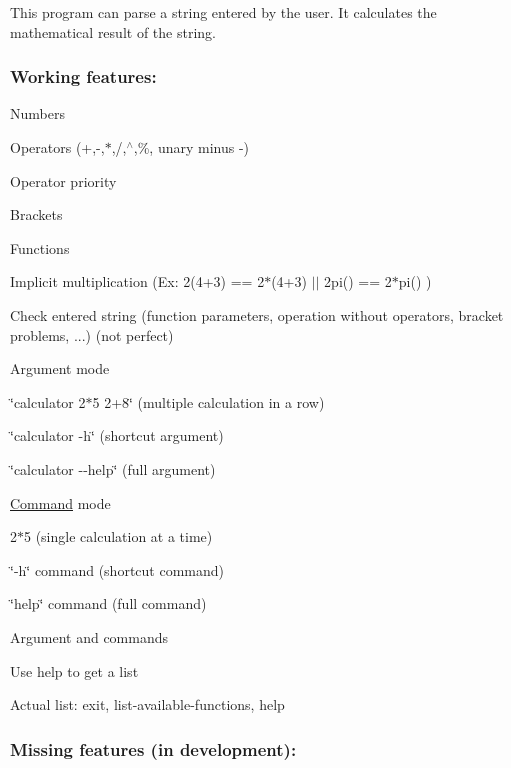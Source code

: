 This program can parse a string entered by the user. It calculates the mathematical result of the string.

\subsubsection*{Working features\+:}


\begin{DoxyItemize}
\item Numbers
\item Operators (+,-\/,$\ast$,/,$^\wedge$,\%, unary minus -\/)
\item Operator priority
\item Brackets
\item Functions
\item Implicit multiplication (Ex\+: 2(4+3) == 2$\ast$(4+3) $\vert$$\vert$ 2pi() == 2$\ast$pi() )
\item Check entered string (function parameters, operation without operators, bracket problems, ...) (not perfect)
\item Argument mode
\begin{DoxyItemize}
\item \char`\"{}calculator 2$\ast$5 2+8\char`\"{} (multiple calculation in a row)
\item \char`\"{}calculator -\/h\char`\"{} (shortcut argument)
\item \char`\"{}calculator -\/-\/help\char`\"{} (full argument)
\end{DoxyItemize}
\item \hyperlink{class_command}{Command} mode
\begin{DoxyItemize}
\item 2$\ast$5 (single calculation at a time)
\item \char`\"{}-\/h\char`\"{} command (shortcut command)
\item \char`\"{}help\char`\"{} command (full command)
\end{DoxyItemize}
\item Argument and commands
\begin{DoxyItemize}
\item Use help to get a list
\item Actual list\+: exit, list-\/available-\/functions, help
\end{DoxyItemize}
\end{DoxyItemize}

\subsubsection*{Missing features (in development)\+:}


